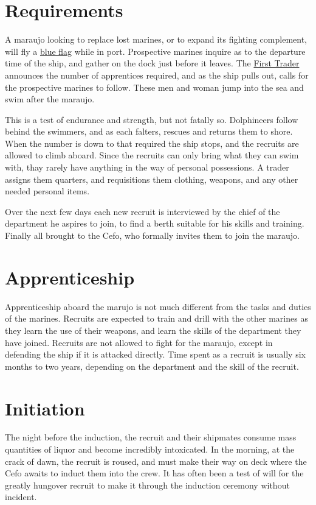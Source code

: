 \begin{multicols*}{2}
\section{Requirements}

A maraujo looking to replace lost marines, or to expand its fighting complement, will fly a \ul{blue flag} while in
port. Prospective marines inquire as to the departure time of the ship, and gather on the dock just before it leaves. The \ul{First Trader} announces the number of apprentices required, and as the ship pulls out, calls for the prospective marines to follow. These men and woman jump into the sea and swim
after the maraujo.

This is a test of endurance and strength, but not fatally so. Dolphineers follow behind the swimmers, and as each falters, rescues  and returns them to shore. When the number is down to that required the ship stops, and the recruits are allowed to climb aboard. Since the recruits can only bring what they can swim with, thay rarely have anything in the way of personal possessions. A trader assigns them quarters, and requisitions them clothing, weapons, and any other needed personal items.

Over the next few days each new recruit is interviewed by the chief of the department he aspires to join, to find a berth suitable for his skills and training. Finally all brought to the Cefo, who formally invites them to join the maraujo.

\section{Apprenticeship}

Apprenticeship aboard the marujo is not much different from the tasks and duties of the marines. Recruits are expected to train and drill with the other marines as they learn the use of their weapons, and learn the skills of the department they have joined. Recruits are not allowed to fight for the maraujo, except in defending the ship if it is attacked directly. Time spent as a recruit is usually six months to two
years, depending on the department and the skill of the recruit.

\section{Initiation}

The night before the induction, the recruit and their shipmates consume mass quantities of liquor and become incredibly intoxicated. In the morning, at the crack of dawn, the recruit is roused, and must make their way on deck where the Cefo awaits to induct them into the crew. It has often been a test of will for the greatly hungover recruit to make it through the induction ceremony without incident.


\end{multicols*}
